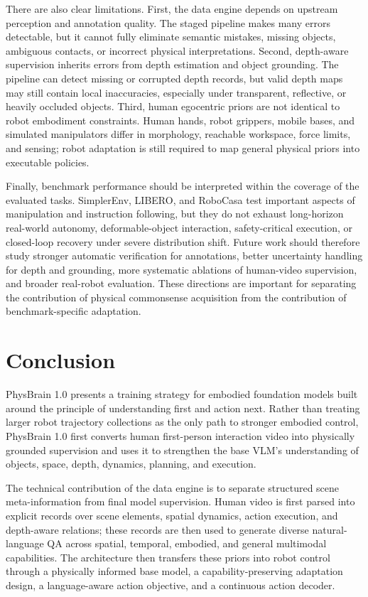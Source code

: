 There are also clear limitations. First, the data engine depends on upstream perception and annotation quality. The staged pipeline makes many errors detectable, but it cannot fully eliminate semantic mistakes, missing objects, ambiguous contacts, or incorrect physical interpretations. Second, depth-aware supervision inherits errors from depth estimation and object grounding. The pipeline can detect missing or corrupted depth records, but valid depth maps may still contain local inaccuracies, especially under transparent, reflective, or heavily occluded objects. Third, human egocentric priors are not identical to robot embodiment constraints. Human hands, robot grippers, mobile bases, and simulated manipulators differ in morphology, reachable workspace, force limits, and sensing; robot adaptation is still required to map general physical priors into executable policies.

Finally, benchmark performance should be interpreted within the coverage of the evaluated tasks. SimplerEnv, LIBERO, and RoboCasa test important aspects of manipulation and instruction following, but they do not exhaust long-horizon real-world autonomy, deformable-object interaction, safety-critical execution, or closed-loop recovery under severe distribution shift. Future work should therefore study stronger automatic verification for annotations, better uncertainty handling for depth and grounding, more systematic ablations of human-video supervision, and broader real-robot evaluation. These directions are important for separating the contribution of physical commonsense acquisition from the contribution of benchmark-specific adaptation.

\section{Conclusion}
\label{sec:conclusion}

PhysBrain 1.0 presents a training strategy for embodied foundation models built around the principle of understanding first and action next. Rather than treating larger robot trajectory collections as the only path to stronger embodied control, PhysBrain 1.0 first converts human first-person interaction video into physically grounded supervision and uses it to strengthen the base VLM's understanding of objects, space, depth, dynamics, planning, and execution.

The technical contribution of the data engine is to separate structured scene meta-information from final model supervision. Human video is first parsed into explicit records over scene elements, spatial dynamics, action execution, and depth-aware relations; these records are then used to generate diverse natural-language QA across spatial, temporal, embodied, and general multimodal capabilities. The architecture then transfers these priors into robot control through a physically informed base model, a capability-preserving adaptation design, a language-aware action objective, and a continuous action decoder.

